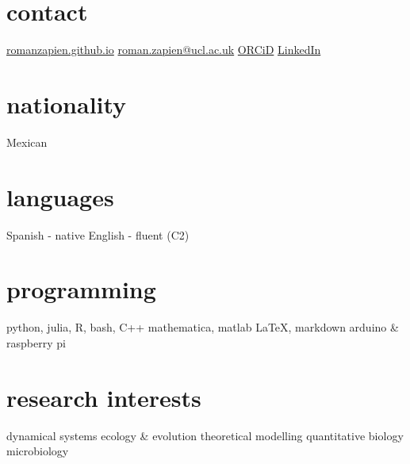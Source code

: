\documentclass[]{friggeri-cv} %
\begin{document}


\begin{aside} %
\section{contact}
\href{https://romanzapien.github.io}{romanzapien.github.io}
\href{mailto:roman.zapien@ucl.ac.uk}{roman.zapien@ucl.ac.uk}
\href{https://orcid.org/0000-0003-0221-0936}{ORCiD}
\href{https://www.linkedin.com/in/romanzapien-campos/}{LinkedIn}
\section{nationality}
Mexican
\section{languages}
Spanish - native
English - fluent (C2)
\section{programming}
python, julia, R, bash, C++ 
mathematica, matlab
LaTeX, markdown
arduino \& raspberry pi
\section{research interests}
dynamical systems
ecology \& evolution
theoretical modelling
quantitative biology
microbiology
\end{aside}

\end{document}
